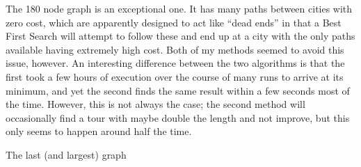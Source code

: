 \documentclass[a4paper,11pt]{article}
\begin{document}
The 180 node graph is an exceptional one. It has many paths between cities with
zero cost, which are apparently designed to act like ``dead ends'' in that a
Best First Search will attempt to follow these and end up at a city with the
only paths available having extremely high cost. Both of my methods seemed to
avoid this issue, however. An interesting difference between the two algorithms
is that the first took a few hours of execution over the course of many runs to 
arrive at its minimum, and yet the second finds the same result within a few 
seconds most of the time. However, this is not always the case; the second
method will occasionally find a tour with maybe double the length and not
improve, but this only seems to happen around half the time.

The last (and largest) graph 
\end{document}
